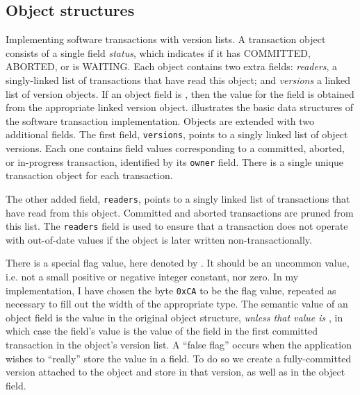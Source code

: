 \subsection{Object structures}%
%
 {Implementing software transactions with version
  lists.  A transaction object consists of a single field {\it
    status}, which indicates if it has COMMITTED, ABORTED, or is WAITING.
  Each object contains two extra fields: {\it readers}, a
  singly-linked list of transactions that have read this object; and
  {\it versions} a linked list of version objects.  If an object field
  is \FLAG, then the value for the field is obtained from the
  appropriate linked version object.}
 illustrates the basic data structures of the \apex
software transaction implementation.  Objects are extended with two
additional fields.  The first field, {\tt versions}, points to a
singly linked list of object versions.  Each one contains field values
corresponding to a committed, aborted, or in-progress transaction,
identified by its {\tt owner} field.  There is a single unique
transaction object for each transaction.

The other added field, {\tt readers}, points to a singly linked list
of transactions that have read from this object.  Committed and
aborted transactions are pruned from this list.  The {\tt readers}
field is used to ensure that a transaction does not operate with
out-of-date values if the object is later written
non-transactionally.

There is a special flag value, here denoted by \FLAG.  It should be
an uncommon value, i.e. not a small positive or negative integer
constant, nor zero.  In my implementation, I have chosen the byte
\texttt{0xCA} to be the flag value, repeated as necessary to fill out
the width of the appropriate type.
The semantic value of an object field is the value in the original
object structure, \emph{unless that value is \FLAG}, in which
case the field's value is the value of the field in the first
committed transaction in the object's version list.  A ``false flag''
occurs when the application wishes to ``really'' store the value \FLAG
in a field. To do so we create a fully-committed version
attached to the object and store \FLAG in that version, as well as in
the object field.\label{pg:falseflag}

